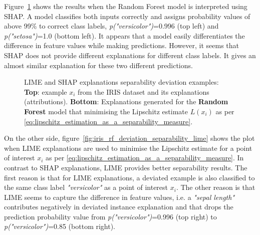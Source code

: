 \documentclass[english]{tktltiki2}
\theoremstyle{definition}
\theoremstyle{remark}
\begin{document}
Figure~\ref{fig:iris_rf_deviation_separability} shows the results when the Random Forest model is interpreted using SHAP. A model classifies both inputs correctly and assigns probability values of above 99\% to correct class labels, \textit{p("versicolor")}=0.996 (top left) and \textit{p("setosa")}=1.0 (bottom left). It appears that a model easily differentiates the difference in feature values while making predictions. However, it seems that SHAP does not provide different explanations for different class labels. It gives an almost similar explanation for these two different predictions. 

\begin{figure}[H]
	\hspace*{\fill}%
	\caption{LIME and SHAP explanations separability deviation examples: \textbf{Top}: example $x_i$ from the IRIS dataset and its explanations (attributions). \textbf{Bottom}: Explanations generated for the \textbf{Random Forest} model that minimising the Lipschitz estimate $L(x_i)$ as per \eqref{eq:lipschitz_estimation_as_a_separability_measure}.}%
	\label{fig:iris_rf_deviation_separability}%
\end{figure}


On the other side, figure~\ref{fig:iris_rf_deviation_separability_lime} shows the plot when LIME explanations are used to minimise the Lipschitz estimate for a point of interest $x_i$ as per \eqref{eq:lipschitz_estimation_as_a_separability_measure}. In contrast to SHAP explanations, LIME provides better separability results. The first reason is that for LIME explanations, a deviated example is also classified to the same class label \textit{"versicolor"} as a point of interest $x_i$. The other reason is that LIME seems to capture the difference in feature values, i.e. a \textit{"sepal length"} contributes negatively in deviated instance explanation and that drops the prediction probability value from \textit{p("versicolor")}=0.996 (top right) to \textit{p("versicolor")}=0.85 (bottom right).
\end{document}
